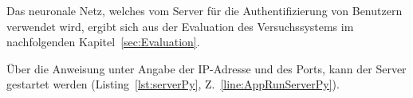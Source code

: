 Das neuronale Netz, welches vom Server für die Authentifizierung von Benutzern verwendet wird, ergibt sich aus der Evaluation des Versuchssystems im nachfolgenden Kapitel~\ref{sec:Evaluation}.

Über die Anweisung  unter Angabe der IP-Adresse und des Ports, kann der Server gestartet werden (Listing~\ref{lst:serverPy}, Z.~\ref{line:AppRunServerPy}).
